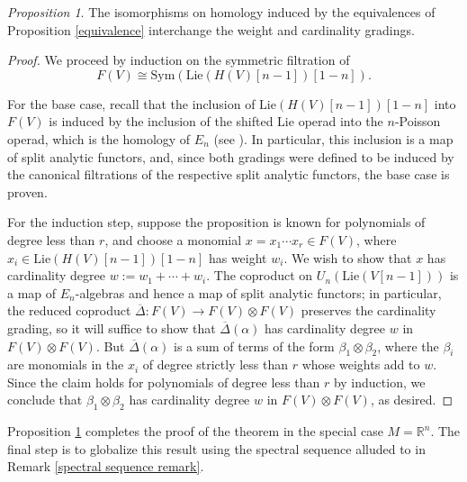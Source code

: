 \documentclass{compositio}
\theoremstyle{definition}\newtheorem{definition}{Definition}[section]
\theoremstyle{theorem}\newtheorem{lemma}[definition]{Lemma}
\theoremstyle{remark}\newtheorem*{conventions}{Conventions}
\theoremstyle{remark}\newtheorem*{acknowledgments}{Acknowledgments}
\theoremstyle{remark}\newtheorem*{outline}{Outline}
\theoremstyle{remark}\newtheorem*{questions}{Questions}
\theoremstyle{remark}\newtheorem{example}[definition]{Example}
\theoremstyle{definition}\newtheorem{construction}[definition]{Construction}
\theoremstyle{definition}\newtheorem*{convention}{Convention}
\theoremstyle{definition}\newtheorem*{conjecture}{Conjecture}
\theoremstyle{theorem}\newtheorem{theorem}[definition]{Theorem}
\theoremstyle{theorem}\newtheorem{paradigm}[definition]{Paradigm}
\theoremstyle{remark}\newtheorem{remark}[definition]{Remark}
\theoremstyle{corollary}\newtheorem{corollary}[definition]{Corollary}
\theoremstyle{theorem}\newtheorem{proposition}[definition]{Proposition}
\theoremstyle{definition}\newtheorem{question}[definition]{Question}
\begin{document}
\begin{proposition}\label{filtration}
The isomorphisms on homology induced by the equivalences of Proposition \ref{equivalence} interchange the weight and cardinality gradings.
\end{proposition}
\begin{proof}
We proceed by induction on the symmetric filtration of $$F(V)\cong {\mathrm{Sym}}({\mathrm{Lie}}(H(V)[n-1])[1-n]).$$

For the base case, recall that the inclusion of ${\mathrm{Lie}}(H(V)[n-1])[1-n]$ into $F(V)$ is induced by the inclusion of the shifted Lie operad into the $n$-Poisson operad, which is the homology of $E_n$ (see \cite{GJ}). In particular, this inclusion is a map of split analytic functors, and, since both gradings were defined to be induced by the canonical filtrations of the respective split analytic functors, the base case is proven.

For the induction step, suppose the proposition is known for polynomials of degree less than $r$, and choose a monomial $x=x_1\cdots x_r\in F(V)$, where $x_i\in {\mathrm{Lie}}(H(V)[n-1])[1-n]$ has weight $w_i$. We wish to show that $x$ has cardinality degree $w:=w_1+\cdots+w_i$. The coproduct on $U_n({\mathrm{Lie}}(V[n-1]))$ is a map of $E_n$-algebras and hence a map of split analytic functors; in particular, the reduced coproduct $\overline\Delta:F(V)\to F(V)\otimes F(V)$ preserves the cardinality grading, so it will suffice to show that $\overline\Delta(\alpha)$ has cardinality degree $w$ in $F(V)\otimes F(V)$. But $\overline\Delta(\alpha)$ is a sum of terms of the form $\beta_1\otimes \beta_2$, where the $\beta_i$ are monomials in the $x_i$ of degree strictly less than $r$ whose weights add to $w$. Since the claim holds for polynomials of degree less than $r$ by induction, we conclude that $\beta_1\otimes \beta_2$ has cardinality degree $w$ in $F(V)\otimes F(V)$, as desired.
\end{proof}

Proposition \ref{filtration} completes the proof of the theorem in the special case $M=\mathbb{R}^n$. The final step is to globalize this result using the spectral sequence alluded to in Remark \ref{spectral sequence remark}.
\end{document}
